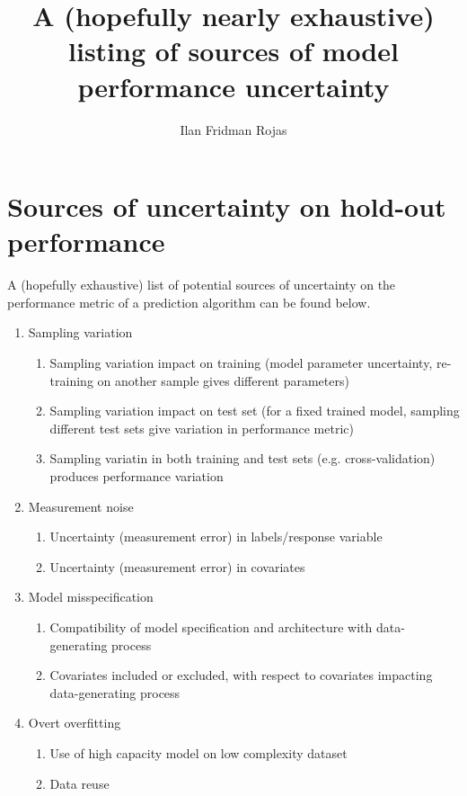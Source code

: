 \documentclass[12pt]{article} %
\title{A (hopefully nearly exhaustive) listing of sources of model performance uncertainty}
\author{Ilan Fridman Rojas}
\begin{document}
\nocite{*}
\maketitle

\section{Sources of uncertainty on hold-out performance}
\label{sec:sources}

A (hopefully exhaustive) list of potential sources of uncertainty on the performance metric of a prediction algorithm can be found below.

\begin{enumerate}
\item Sampling variation
	\begin{enumerate}
	\item Sampling variation impact on training (model parameter uncertainty, re-training on another sample gives different parameters)
	\item Sampling variation impact on test set (for a fixed trained model, sampling different test sets give variation in performance metric)
	\item Sampling variatin in both training and test sets (e.g. cross-validation) produces performance variation
	\end{enumerate}
	
\item Measurement noise
	\begin{enumerate}
	\item Uncertainty (measurement error) in labels/response variable
	\item Uncertainty (measurement error) in covariates
	\end{enumerate}
	
\item Model misspecification
	\begin{enumerate}
	\item Compatibility of model specification and architecture with data-generating process
	\item Covariates included or excluded, with respect to covariates impacting data-generating process
	\end{enumerate}

\item Overt overfitting
	\begin{enumerate}
	\item Use of high capacity model on low complexity dataset
	\item Data reuse
	\end{enumerate}
	

\end{enumerate}
\end{document}

